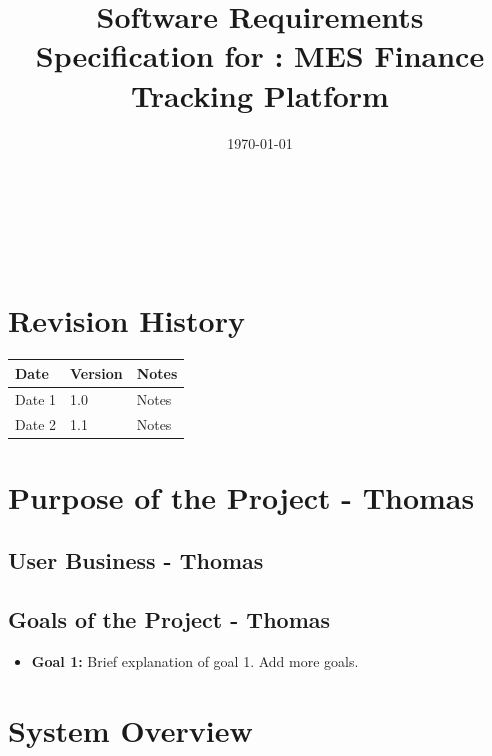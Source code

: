 \documentclass[12pt]{article}
\begin{document}
\title{Software Requirements Specification for \progname: MES Finance Tracking Platform} 
\author{\authname}
\date{\today}
	
\maketitle

~\newpage


\tableofcontents

~\newpage

\section*{Revision History}

\begin{tabularx}{\textwidth}{p{3cm}p{2cm}X}
  \toprule {\bf Date} & {\bf Version} & {\bf Notes}\\
    \midrule
      Date 1 & 1.0 & Notes\\
      Date 2 & 1.1 & Notes\\
  \bottomrule
\end{tabularx}

\newpage
{}


\section{Purpose of the Project - Thomas}

  \subsection{User Business - Thomas}


  \subsection{Goals of the Project - Thomas}
  \begin{itemize}
      \item \textbf{Goal 1:} Brief explanation of goal 1. Add more goals.
  \end{itemize}

\section{System Overview}
\end{document}
